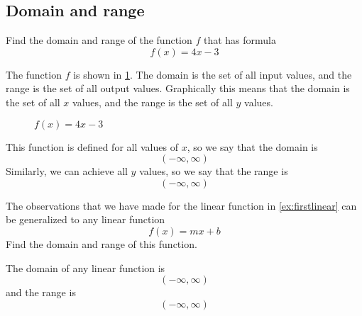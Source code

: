 \subsection{Domain and range}
\begin{myexample}\label{ex:firstlinear}
Find the domain and range of the function $f$ that has formula
\[
	f(x) = 4x - 3
\]
{}
\end{myexample}
\begin{myProof}
	The function $f$ is shown in \cref{fig:linfunction}. 
	The domain is the set of all input values, and the range is the set of all output values.
	Graphically this means that the domain is the set of all $x$ values, and the range is the 
	set of all $y$ values.
				
	\begin{figure}[!h]
		\centering
		\caption{$f(x)=4x-3$}
		\label{fig:linfunction}
	\end{figure}
				
	This function is defined for all values of $x$, so we say that the domain is
	\[
		(-\infty, \infty )
	\]  
	Similarly, we can achieve all $y$ values, so we say that the range is
	\[
		(-\infty, \infty)
	\]
				
\end{myProof} 

\begin{myexample}
The observations that we have made for the linear function in \cref{ex:firstlinear} can be generalized 
to any linear function
\[
	f(x) = mx +b
\]
Find the domain and range of this function.
{}
\end{myexample}
\begin{myProof}
	The domain of any linear function is
	\[
		(-\infty, \infty )
	\]
	and the range is
	\[
		(-\infty, \infty )
	\]
	{}
\end{myProof} 

